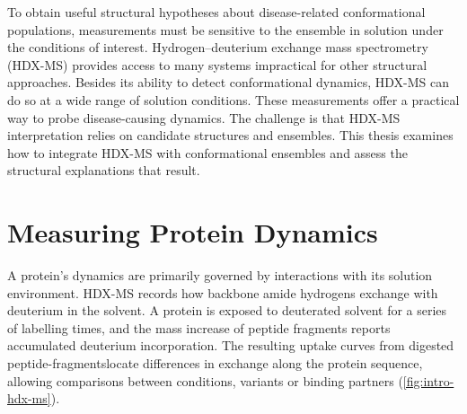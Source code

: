 To obtain useful structural hypotheses about disease-related conformational populations, measurements must be sensitive to the ensemble in solution under the conditions of interest. Hydrogen--deuterium exchange mass spectrometry (HDX-MS) provides access to many systems impractical for other structural approaches.\supercite{jamesAdvancesHydrogenDeuterium2022} Besides its ability to detect conformational dynamics, HDX-MS can do so at a wide range of solution conditions.\supercite{skinnerProteinHydrogenExchange2012} These measurements offer a practical way to probe disease-causing dynamics. The challenge is that HDX-MS interpretation relies on candidate structures and ensembles. This thesis examines how to integrate HDX-MS with conformational ensembles and assess the structural explanations that result.

\section{Measuring Protein Dynamics}
\label{sec:intro-measurement}

A protein's dynamics are primarily governed by interactions with its solution environment. HDX-MS records how backbone amide hydrogens exchange with deuterium in the solvent. A protein is exposed to deuterated solvent for a series of labelling times, and the mass increase of peptide fragments reports accumulated deuterium incorporation.\supercite{massonOverviewHydrogenDeuterium2017,jamesAdvancesHydrogenDeuterium2022} The resulting uptake curves from digested peptide-fragmentslocate differences in exchange along the protein sequence, allowing comparisons between conditions, variants or binding partners (\autoref{fig:intro-hdx-ms}).

